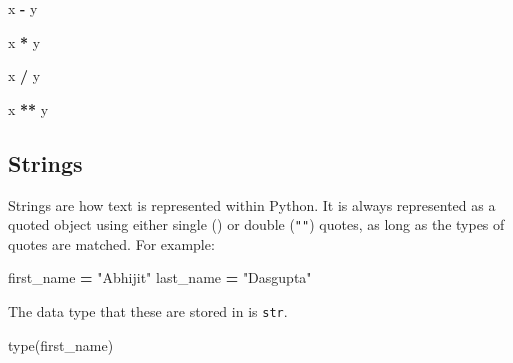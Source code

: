 \documentclass[
  letterpaper,
]{scrbook}
\newenvironment{Shaded}{\begin{snugshade}}{\end{snugshade}}
\newcommand{\BuiltInTok}[1]{#1}
\newcommand{\NormalTok}[1]{#1}
\newcommand{\OperatorTok}[1]{\textcolor[rgb]{0.81,0.36,0.00}{\textbf{#1}}}
\newcommand{\StringTok}[1]{\textcolor[rgb]{0.31,0.60,0.02}{#1}}
\begin{document}
\begin{Shaded}
\begin{Highlighting}[]
\NormalTok{x }\OperatorTok{{-}}\NormalTok{ y}
\end{Highlighting}
\end{Shaded}

\begin{Shaded}
\begin{Highlighting}[]
\NormalTok{x }\OperatorTok{*}\NormalTok{ y}
\end{Highlighting}
\end{Shaded}

\begin{Shaded}
\begin{Highlighting}[]
\NormalTok{x }\OperatorTok{/}\NormalTok{ y}
\end{Highlighting}
\end{Shaded}

\begin{Shaded}
\begin{Highlighting}[]
\NormalTok{x }\OperatorTok{**}\NormalTok{ y}
\end{Highlighting}
\end{Shaded}

\hypertarget{strings}{%
\subsection{Strings}\label{strings}}

Strings are how text is represented within Python. It is always represented as a quoted object using either single (\texttt{\textquotesingle{}\textquotesingle{}}) or double (\texttt{""}) quotes, as long as the types of quotes are matched. For example:

\begin{Shaded}
\begin{Highlighting}[]
\NormalTok{first\_name }\OperatorTok{=} \StringTok{"Abhijit"}
\NormalTok{last\_name }\OperatorTok{=} \StringTok{"Dasgupta"}
\end{Highlighting}
\end{Shaded}

The data type that these are stored in is \texttt{str}.

\begin{Shaded}
\begin{Highlighting}[]
\BuiltInTok{type}\NormalTok{(first\_name)}
\end{Highlighting}
\end{Shaded}
\end{document}
